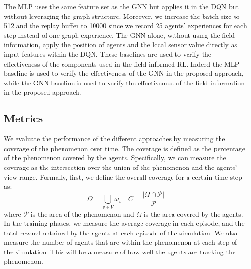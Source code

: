 \documentclass[conference]{IEEEtran}
\begin{document}
The \ac{MLP} uses the same feature set as the \ac{GNN} but applies it in the \ac{DQN} but 
without leveraging the graph structure. Moreover, we increase the batch size to 512 and the replay buffer to 10000 since we record 25 agents' experiences for each step instead of one graph experience.
%
The \ac{GNN} alone, without using the field information, apply the position of agents and the local sensor value directly as input features within the \ac{DQN}.
%
These baselines are used to verify the effectiveness of the components used in the field-informed \ac{RL}. 
%
Indeed the \ac{MLP} baseline is used to verify the effectiveness of the \ac{GNN} in the proposed approach, while the \ac{GNN} baseline is used to verify the effectiveness of the field information in the proposed approach.
\subsection{Metrics}
We evaluate the performance of the different approaches by measuring the coverage of the phenomenon over time.
%
The coverage is defined as the percentage of the phenomenon covered by the agents.
%
Specifically, we can measure the coverage as the intersection over the union of the phenomenon and the agents' view range.
%
Formally, first, we define the overall coverage for a certain time step as:
\begin{equation*}
\Omega = \bigcup_{v \in V} \omega_v
\quad 
C = \frac{|\Omega \cap \mathcal{P}|}{|\mathcal{P}|}
\end{equation*}
where $\mathcal{P}$ is the area of the phenomenon and $\Omega$ is the area covered by the agents.
In the training phases, 
 we measure the average coverage in each episode, and the total reward obtained by the agents at each episode of the simulation. 
%
We also measure the number of agents that are within the phenomenon at each step of the simulation.
This will be a measure of how well the agents are tracking the phenomenon.
\end{document}
